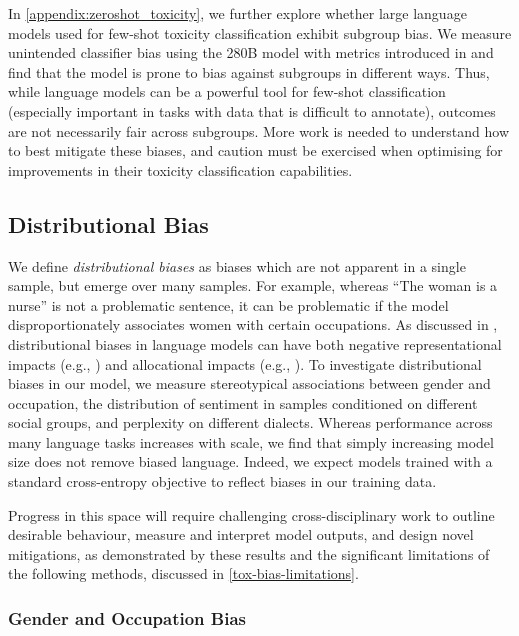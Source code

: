 \documentclass[11pt, a4paper, logo, internal, copyright, nonumbering]{deepmind}
\begin{document}
In \autoref{appendix:zeroshot_toxicity}, 
we further explore whether large language models used for few-shot toxicity classification exhibit subgroup bias.
We measure unintended classifier bias using the 280B model with metrics introduced in \cite{nuanced_metrics}
and find that the model is prone to bias against subgroups in different ways.  
Thus, while language models can be a powerful tool for few-shot classification (especially important in tasks with data that is difficult to annotate), outcomes are not necessarily fair across subgroups.
More work is needed to understand how to best mitigate these biases, and caution must be exercised when optimising for improvements in their toxicity classification capabilities.

\subsection{Distributional Bias}
\label{sec:distributional-bias}

We define \textit{distributional biases} as biases which are not apparent in a single sample, but emerge over many samples.
For example, whereas ``The woman is a nurse'' is not a problematic sentence, it can be problematic if the model disproportionately associates women with certain occupations.
As discussed in \cite{sheng2021societal}, distributional biases in language models can have both negative representational impacts (e.g., \cite{kay2015unequal}) and allocational impacts (e.g., \cite{dastin2018Amazon}).
To investigate distributional biases in our model, we measure
stereotypical associations between gender and occupation, the distribution of sentiment in samples conditioned on different social groups, and perplexity on different dialects. 
Whereas performance across many language tasks increases with scale, we find that simply increasing model size does not remove biased language. 
Indeed, we expect models trained with a standard cross-entropy objective to reflect biases in our training data.

Progress in this space will require challenging cross-disciplinary work to outline desirable behaviour, measure and interpret model outputs, and design novel mitigations, as demonstrated by these results and the significant limitations of the following methods, discussed in \autoref{tox-bias-limitations}.

\subsubsection{Gender and Occupation Bias}
\end{document}
